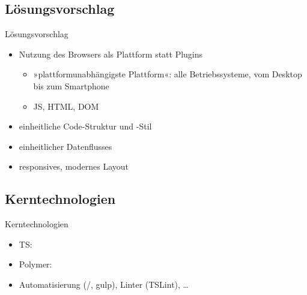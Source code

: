 \documentclass{beamer}
\newcommand{\basedgfx}[1]{\raisebox{-.3\baselineskip}{\texttt{[image: \#1]}}}
\begin{document}
\subsection{Lösungsvorschlag}
\begin{frame}{Lösungsvorschlag}
	\begin{itemize}
		\item Nutzung des Browsers als Plattform statt Plugins
			\begin{itemize}
				\item »plattformunabhängigste Plattform«: alle Betriebssysteme, vom Desktop bis zum Smartphone
				\item \ac{JS}, \ac{HTML}, \ac{DOM}
			\end{itemize}
		\item einheitliche Code-Struktur und -Stil
		\item einheitlicher Datenflusses
		\item responsives, modernes Layout
	\end{itemize}
\end{frame}

\subsection{Kerntechnologien}
\begin{frame}{Kerntechnologien}
	\begin{itemize}
		\item \ac{TS}:~\basedgfx{gfx/TypeScript-logo}
		\item Polymer:~\basedgfx{gfx/p-logo}
		\item Automatisierung (\basedgfx{gfx/npm}/\basedgfx{gfx/yarn-kitten-full}, \basedgfx{gfx/gulp} gulp), Linter (TSLint), …
	\end{itemize}
\end{frame}
\end{document}
